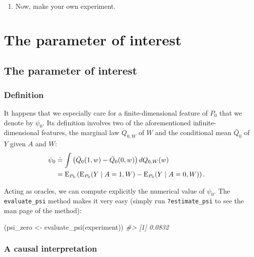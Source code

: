 \documentclass[
  11pt,
  openright,twoside]{book}
\newenvironment{Shaded}{\begin{snugshade}}{\end{snugshade}}
\newcommand{\CommentTok}[1]{\textcolor[rgb]{0.56,0.35,0.01}{\textit{#1}}}
\newcommand{\FunctionTok}[1]{\textcolor[rgb]{0.00,0.00,0.00}{#1}}
\newcommand{\NormalTok}[1]{#1}
\newcommand{\OtherTok}[1]{\textcolor[rgb]{0.56,0.35,0.01}{#1}}
\providecommand{\tightlist}{%
  \setlength{\itemsep}{0pt}\setlength{\parskip}{0pt}}
\newcommand{\defq}{\doteq}
\newcommand{\Exp}{\textrm{E}}
\newcommand{\Qbar}{\bar{Q}}
\theoremstyle{definition}
\theoremstyle{definition}
\theoremstyle{definition}
\theoremstyle{definition}
\theoremstyle{remark}
\begin{document}
\begin{enumerate}
\def\labelenumi{\arabic{enumi}.}
\setcounter{enumi}{4}
\tightlist
\item
  Now, make your own experiment.
\end{enumerate}

\hypertarget{parameter}{%
\chapter{The parameter of interest}\label{parameter}}

\hypertarget{parameter-first-pass}{%
\section{The parameter of interest}\label{parameter-first-pass}}

\hypertarget{definition}{%
\subsection{Definition}\label{definition}}

It happens that we especially care for a finite-dimensional feature of \(P_{0}\)
that we denote by \(\psi_{0}\). Its definition involves two of the
aforementioned infinite-dimensional features, the marginal law \(Q_{0,W}\) of
\(W\) and the conditional mean \(\Qbar_{0}\) of \(Y\) given \(A\) and \(W\):
\begin{align}  \psi_{0}  &\defq  \int \left(\Qbar_{0}(1,  w)  -  \Qbar_{0}(0,
w)\right)    dQ_{0,W}(w)    \label{eq:psi-zero}\\     \notag    &=    \Exp_{P_{0}}
\left(\Exp_{P_0}(Y \mid  A =  1, W)  - \Exp_{P_0}(Y  \mid A  = 0,  W) \right).
\end{align}

Acting as oracles, we can compute explicitly the numerical value of
\(\psi_{0}\). The \texttt{evaluate\_psi} method makes it very easy (simply run
\texttt{?estimate\_psi} to see the man page of the method):

\begin{Shaded}
\begin{Highlighting}[]
\NormalTok{(psi\_zero }\OtherTok{\textless{}{-}} \FunctionTok{evaluate\_psi}\NormalTok{(experiment))}
\CommentTok{\#\textgreater{} [1] 0.0832}
\end{Highlighting}
\end{Shaded}

\hypertarget{causal-interpretation}{%
\subsection{A causal interpretation}\label{causal-interpretation}}
\end{document}
